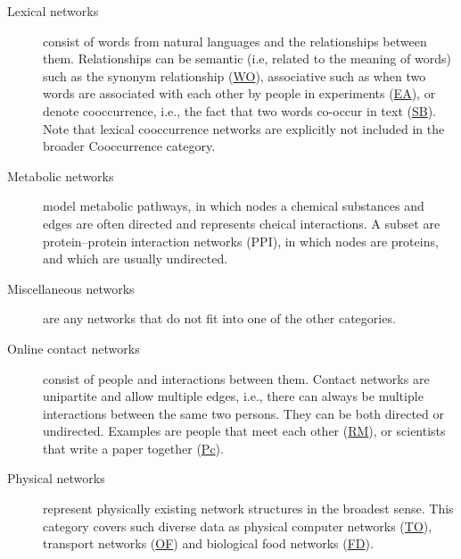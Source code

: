 \documentclass{article}
\begin{document}
\begin{description}
\item[Lexical networks] consist of words from natural 
  languages and the
  relationships between them. 
  Relationships can be semantic (i.e, related to the
  meaning of words) such as the
  synonym
    relationship (\href{http://konect.uni-koblenz.de/networks/wordnet-words}{\textsf{WO}}), associative such
  as when two words are associated with each other by people in
  experiments (\href{http://konect.uni-koblenz.de/networks/eat}{\textsf{EA}}), or denote 
  cooccurrence, i.e., the fact that two words co-occur in text (\href{http://konect.uni-koblenz.de/networks/lasagne-spanishbook}{\textsf{SB}}).  Note
  that lexical cooccurrence networks are explicitly not included in the
  broader Cooccurrence category. 

\item[Metabolic networks] model metabolic pathways,
  in which nodes a chemical substances and edges are often directed and
  represents cheical interactions.  A subset are protein--protein
  interaction networks (PPI), in which nodes are proteins, and which are
  usually undirected. 

\item[Miscellaneous networks] are any networks that do not fit into one
  of the other categories. 
  
\item[Online contact networks] consist of people and interactions between
  them. 
  Contact networks are unipartite and allow multiple edges, i.e., there
  can always be multiple interactions between the same two persons.
  They can be both directed or undirected.
  Examples are people that meet each other
  (\href{http://konect.uni-koblenz.de/networks/mit}{\textsf{RM}}), or
  scientists that write a paper together
  (\href{http://konect.uni-koblenz.de/networks/dblp_coauthor}{\textsf{Pc}}).

\item[Physical networks] represent physically existing network
  structures in the broadest sense.  This category covers such diverse data as
  physical computer networks
  (\href{http://konect.uni-koblenz.de/networks/topology}{\textsf{TO}}),
  transport networks
  (\href{http://konect.uni-koblenz.de/networks/opsahl-openflights}{\textsf{OF}})
  and biological food networks
  (\href{http://konect.uni-koblenz.de/networks/foodweb-baydry}{\textsf{FD}}).   


\end{description}
\end{document}
